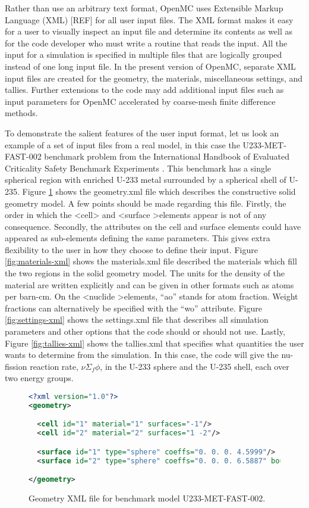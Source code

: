 \documentclass{elsarticle}
\begin{document}
Rather than use an arbitrary text format, OpenMC uses Extensible Markup Language
(XML) [REF] for all user input files. The XML format makes it easy for a user to
visually inspect an input file and determine its contents as well as for the
code developer who must write a routine that reads the input. All the input for
a simulation is specified in multiple files that are logically grouped instead
of one long input file. In the present version of OpenMC, separate XML input
files are created for the geometry, the materials, miscellaneous settings, and
tallies. Further extensions to the code may add additional input files such as
input parameters for OpenMC accelerated by coarse-mesh finite difference
methods.

To demonstrate the salient features of the user input format, let us look an
example of a set of input files from a real model, in this case the
U233-MET-FAST-002 benchmark problem from the International Handbook of Evaluated
Criticality Safety Benchmark Experiments \cite{icsbep}. This benchmark has a
single spherical region with enriched U-233 metal surrounded by a spherical
shell of U-235. Figure \ref{fig:geometry-xml} shows the geometry.xml file which
describes the constructive solid geometry model. A few points should be made
regarding this file. Firstly, the order in which the \textless cell\textgreater
and \textless surface \textgreater elements appear is not of any
consequence. Secondly, the attributes on the cell and surface elements could
have appeared as sub-elements defining the same parameters. This gives extra
flexibility to the user in how they choose to define their input. Figure
\ref{fig:materials-xml} shows the materials.xml file described the materials
which fill the two regions in the solid geometry model. The units for the
density of the material are written explicitly and can be given in other formats
such as atoms per barn-cm. On the \textless nuclide \textgreater elements,
``ao'' stands for atom fraction. Weight fractions can alternatively be specified
with the ``wo'' attribute. Figure \ref{fig:settings-xml} shows the settings.xml
file that describes all simulation parameters and other options that the code
should or should not use. Lastly, Figure \ref{fig:tallies-xml} shows the
tallies.xml that specifies what quantities the user wants to determine from the
simulation. In this case, the code will give the nu-fission reaction rate,
$\nu\Sigma_f\phi$, in the U-233 sphere and the U-235 shell, each over two energy
groups.

\begin{figure}
  \begin{lstlisting}[language=xml]
<?xml version="1.0"?>
<geometry>

  <cell id="1" material="1" surfaces="-1"/>
  <cell id="2" material="2" surfaces="1 -2"/>

  <surface id="1" type="sphere" coeffs="0. 0. 0. 4.5999"/>
  <surface id="2" type="sphere" coeffs="0. 0. 0. 6.5887" boundary="vacuum"/>

</geometry>
  \end{lstlisting}
  \caption{Geometry XML file for benchmark model U233-MET-FAST-002.}
  \label{fig:geometry-xml}
\end{figure}
\end{document}
